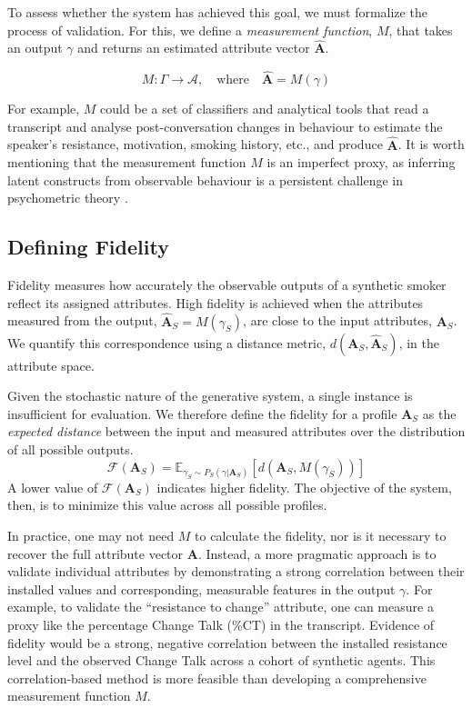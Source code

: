 To assess whether the system has achieved this goal, we must formalize the process of validation. For this, we define a \emph{measurement function}, $M$, that takes an output $\gamma$ and returns an estimated attribute vector $\hat{\textbf{A}}$.

$$M: \Gamma \rightarrow \mathcal{A}, \quad \text{where} \quad \hat{\textbf{A}} = M(\gamma)$$

For example, $M$ could be a set of classifiers and analytical tools that read a transcript and analyse post-conversation changes in behaviour to estimate the speaker's resistance, motivation, smoking history, etc., and produce $\hat{\textbf{A}}$. It is worth mentioning that the measurement function $M$ is an imperfect proxy, as inferring latent constructs from observable behaviour is a persistent challenge in psychometric theory \cite{loevinger1957objective, borsboom2004concept}.

\subsection{Defining Fidelity}
Fidelity measures how accurately the observable outputs of a synthetic smoker reflect its assigned attributes. High fidelity is achieved when the attributes measured from the output, $\hat{\textbf{A}}_S = M(\gamma_S)$, are close to the input attributes, $\textbf{A}_S$. We quantify this correspondence using a distance metric, $d(\textbf{A}_S, \hat{\textbf{A}}_S)$, in the attribute space.

Given the stochastic nature of the generative system, a single instance is insufficient for evaluation. We therefore define the fidelity for a profile $\textbf{A}_S$ as the \emph{expected distance} between the input and measured attributes over the distribution of all possible outputs.
$$\mathcal{F}(\textbf{A}_S) = \mathbb{E}_{\gamma_S \sim P_S(\gamma | \textbf{A}_S)}[d(\textbf{A}_S, M(\gamma_S))]$$
A lower value of $\mathcal{F}(\textbf{A}_S)$ indicates higher fidelity. The objective of the system, then, is to minimize this value across all possible profiles.

In practice, one may not need $M$ to calculate the fidelity, nor is it necessary to recover the full attribute vector $\textbf{A}$. Instead, a more pragmatic approach is to validate individual attributes by demonstrating a strong correlation between their installed values and corresponding, measurable features in the output $\gamma$. For example, to validate the ``resistance to change'' attribute, one can measure a proxy like the percentage Change Talk (\%CT) in the transcript. Evidence of fidelity would be a strong, negative correlation between the installed resistance level and the observed Change Talk across a cohort of synthetic agents. This correlation-based method is more feasible than developing a comprehensive measurement function $M$.

